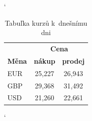 \documentclass[11pt, a4paper]{article}
\begin{document}
\begin{table}[h]
\centering
\catcode`

\begin{tabular}{|l|c|c|} 
    \hline
    & \multicolumn{2}{c|}{\textbf{Cena}}\\\cline{2-3}
    \textbf{Měna} & \textbf{nákup} & \textbf{prodej}\\
    \hline
    EUR & 25,227 & 26,943\\
    GBP & 29,368 & 31,492\\
    USD & 21,260 & 22,661\\
    \hline
\end{tabular}
\caption{Tabuľka kurzů k~dnešnímu dni}
\label{tab:kurz}
\end{table}
\bigskip

\begin{table}[h] 
\centering 
\catcode`


\end{table}
\end{document}
